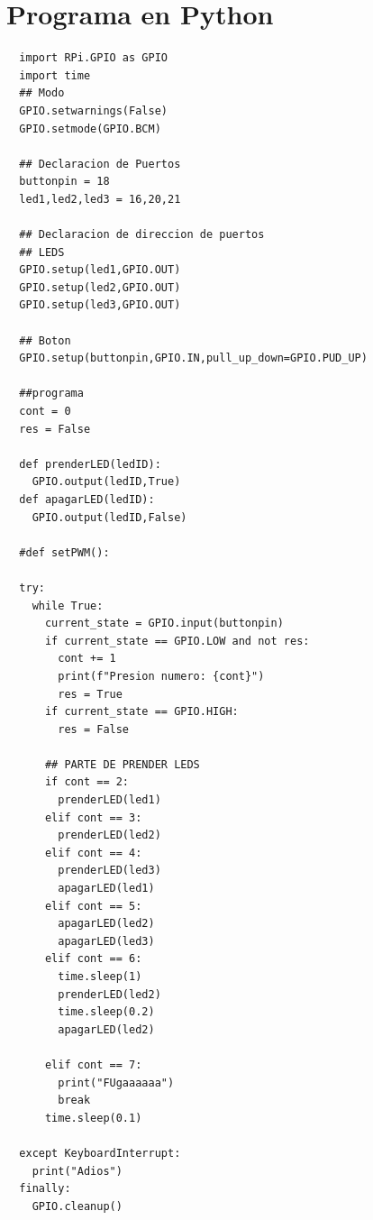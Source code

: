 \documentclass[12pt]{report}
\begin{document}
\section{Programa en Python }
\begin{verbatim}
  import RPi.GPIO as GPIO
  import time
  ## Modo
  GPIO.setwarnings(False)
  GPIO.setmode(GPIO.BCM)

  ## Declaracion de Puertos
  buttonpin = 18
  led1,led2,led3 = 16,20,21

  ## Declaracion de direccion de puertos
  ## LEDS
  GPIO.setup(led1,GPIO.OUT)
  GPIO.setup(led2,GPIO.OUT)
  GPIO.setup(led3,GPIO.OUT)

  ## Boton
  GPIO.setup(buttonpin,GPIO.IN,pull_up_down=GPIO.PUD_UP)

  ##programa
  cont = 0
  res = False

  def prenderLED(ledID):
    GPIO.output(ledID,True)
  def apagarLED(ledID):
    GPIO.output(ledID,False)

  #def setPWM():

  try:
    while True:
      current_state = GPIO.input(buttonpin)
      if current_state == GPIO.LOW and not res:
        cont += 1
        print(f"Presion numero: {cont}")
        res = True
      if current_state == GPIO.HIGH:
        res = False

      ## PARTE DE PRENDER LEDS
      if cont == 2:
        prenderLED(led1)
      elif cont == 3:
        prenderLED(led2)
      elif cont == 4:
        prenderLED(led3)
        apagarLED(led1)
      elif cont == 5:
        apagarLED(led2)
        apagarLED(led3)
      elif cont == 6:
        time.sleep(1)
        prenderLED(led2)
        time.sleep(0.2)
        apagarLED(led2)

      elif cont == 7:
        print("FUgaaaaaa")
        break
      time.sleep(0.1)

  except KeyboardInterrupt:
    print("Adios")
  finally:
    GPIO.cleanup()
\end{verbatim}
\end{document}
